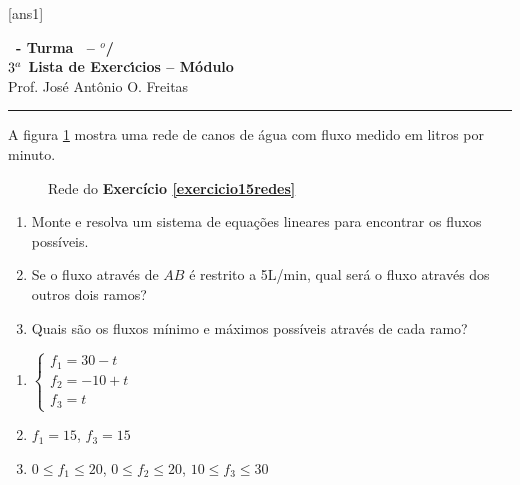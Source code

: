 \documentclass[12pt]{exam}
\begin{document}
  [ans1]
  \begin{center}
    {\Large\bf \disciplina\ - Turma \turma\ -- \semestre$^{o}$/\ano} \\ \vspace{9pt} {\large\bf
        $3^a$ Lista de Exerc{\'\i}cios -- Módulo \numeromodulo}\\ \vspace{9pt} Prof. Jos{\'e} Ant{\^o}nio O. Freitas
  \end{center}
  \hrule


\begin{exercicio}\label{exercicio15redes}
  A figura \ref{exercicio15redespoole} mostra uma rede de canos de água com fluxo medido em litros por minuto.
  \begin{figure}[!h]
    \centering
    
    \caption{Rede do \textbf{Exercício \ref{exercicio15redes}}}
    \label{exercicio15redespoole}
  \end{figure}

  \begin{enumerate}[label={\alph*})]
    \item Monte e resolva um sistema de equações lineares para encontrar os fluxos possíveis.
    \item Se o fluxo através de $AB$ é restrito a 5L/min, qual será o fluxo através dos outros dois ramos?
    \item Quais são os fluxos mínimo e máximos possíveis através de cada ramo?
  \end{enumerate}
  \begin{solucao}
    \begin{enumerate}
      \item $\begin{cases}f_1 = 30 - t\\f_2 = -10 + t\\f_3 = t\end{cases}$
      \item $f_1 = 15$, $f_3 = 15$
      \item $0 \le f_1 \le 20$, $0 \le f_2 \le 20$, $10 \le f_3 \le 30$
    \end{enumerate}
  \end{solucao}
\end{exercicio}
\end{document}
